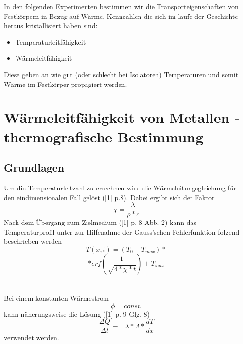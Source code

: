 \documentclass[12pt,a4paper]{article}
\begin{document}
\begin{multicols}{2}




%			


\noindent In den folgenden Experimenten bestimmen wir die Transporteigenschaften von Festkörpern in Bezug auf Wärme. Kennzahlen die sich im laufe der Geschichte heraus kristallisiert haben sind:\\
\begin{itemize}
	\item Temperaturleitfähigkeit
	\item Wärmeleitfähigkeit
\end{itemize}
Diese geben an wie gut (oder schlecht bei Isolatoren) Temperaturen und somit Wärme im Festkörper propagiert werden.

\section{Wärmeleitfähigkeit von Metallen - thermografische Bestimmung}

\subsection{Grundlagen}
Um die Temperaturleitzahl zu errechnen wird die Wärmeleitungsgleichung für den eindimensionalen Fall gelöst ([1] p.8). Dabei ergibt sich der Faktor 
$$\chi = \frac{\lambda}{\rho*c}$$
Nach dem Übergang zum Zielmedium ([1] p. 8 Abb. 2) kann das Temperaturprofil unter zur Hilfenahme der Gauss'schen  Fehlerfunktion folgend beschrieben werden
$$T(x,t) = (T_0 - T_{max}) * $$
$$ * erf(\frac{1}{\sqrt{4 * \chi * t}})+T_{max}$$
\\
\\
Bei einem konstanten Wärmestrom
$$\phi = const.$$
kann näherungsweise die Lösung ([1] p. 9 Glg. 8) 
$$\frac{\Delta Q}{\Delta t} = -\lambda * A * \frac{dT}{dx}$$
verwendet werden.

\end{multicols}
\end{document}
